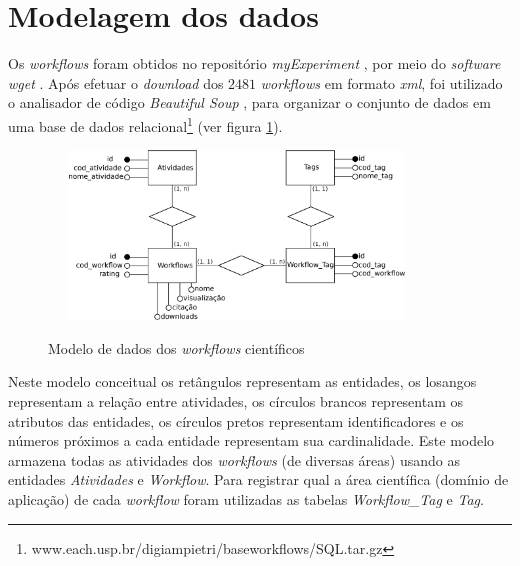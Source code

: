 \section{Modelagem dos dados}\label{SEC_MODELAGEM} 
Os \emph{workflows} foram obtidos no repositório \emph{myExperiment} \cite{ROURE2015}, por meio do \emph{software wget} \cite{wget2015}. Após efetuar o \emph{download} dos \(2481\) \emph{workflows} em formato \emph{xml}, foi utilizado o analisador de código \emph{Beautiful Soup} \cite{BeautifulSoup2015}, para organizar o conjunto de dados em uma base de dados relacional\footnote{www.each.usp.br/digiampietri/baseworkflows/SQL.tar.gz} (ver figura \ref{figura_modelo_conceitual}).
\begin{figure}[!hbt]
    \centering  
    \caption{Modelo de dados dos \emph{workflows} científicos}
    \includegraphics[width=10cm, height=4.5cm]{./secoes/solucaoProposta/pics/img/modelo_conceitual.eps}
    \label{figura_modelo_conceitual}
	\vspace{0.1cm}
    \source{\varAutorData}
\end{figure}
Neste modelo conceitual os retângulos representam as entidades, os losangos representam a relação entre atividades, os círculos brancos representam os atributos das entidades, os círculos pretos representam identificadores e os números próximos a cada entidade representam sua cardinalidade. Este modelo armazena todas as atividades dos \emph{workflows} (de diversas áreas) usando as entidades \emph{Atividades} e \emph{Workflow}. Para registrar qual a área científica (domínio de aplicação) de cada \emph{workflow} foram utilizadas as tabelas \emph{Workflow\_Tag} e \emph{Tag}.

